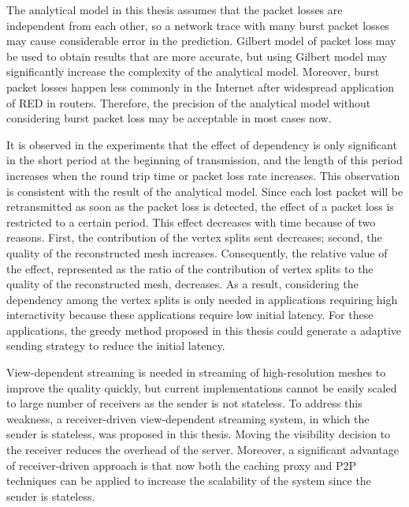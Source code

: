 \documentclass[11pt, a4paper]{report}
\begin{document}
The analytical model in this thesis assumes that the packet losses 
are independent from each other, 
so a network trace with many burst packet losses may cause considerable error in the prediction. 
Gilbert model of packet loss may be used to obtain results that are more accurate, 
but using Gilbert model may significantly increase the complexity of the analytical model. 
Moreover, burst packet losses happen less commonly in the Internet
after widespread application of RED in routers. 
Therefore, the precision of the analytical model
without considering burst packet loss may be acceptable in most cases now.

It is observed in the experiments that the effect of dependency
is only significant in the short period at the beginning of transmission, 
and the length of this period increases
when the round trip time or packet loss rate increases. 
This observation is consistent with the result of the analytical model. 
Since each lost packet will be retransmitted as soon as the packet loss is detected, 
the effect of a packet loss is restricted to a certain period. 
This effect decreases with time because of two reasons. 
First, the contribution of the vertex splits sent decreases; 
second, the quality of the reconstructed mesh increases. 
Consequently, the relative value of the effect, 
represented as the ratio of the contribution of vertex
splits to the quality of the reconstructed mesh, decreases.
As a result, considering the dependency among the vertex splits 
is only needed in applications requiring high interactivity
because these applications require low initial latency. 
For these applications, the greedy method proposed in this thesis
could generate a adaptive sending strategy to reduce the initial latency. 

View-dependent streaming is needed in streaming of high-resolution meshes
to improve the quality quickly, but current implementations cannot be easily scaled
to large number of receivers as the sender is not stateless. 
To address this weakness, a receiver-driven view-dependent streaming system,
in which the sender is stateless, was proposed in this thesis. 
Moving the visibility decision to the receiver reduces the overhead of the server. 
Moreover, a significant advantage of receiver-driven approach is that
now both the caching proxy and P2P techniques can be applied to increase the scalability of the system
since the sender is stateless. 
\end{document}
